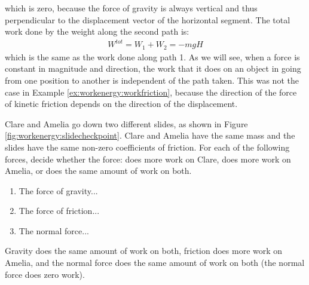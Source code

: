\begin{example}
which is zero, because the force of gravity is always vertical and thus perpendicular to the displacement vector of the horizontal segment. The total work done by the weight along the second path is:
\begin{align*}
W^{tot} = W_1 + W_2 = -mgH
\end{align*}
which is the same as the work done along path 1. As we will see, when a force is constant in magnitude and direction, the work that it does on an object in going from one position to another is independent of the path taken. This was not the case in Example \ref{ex:workenergy:workfriction}, because the direction of the force of kinetic friction depends on the direction of the displacement. 
\end{example} 

\begin{checkpoint}
Clare and Amelia go down two different slides, as shown in Figure \ref{fig:workenergy:slidecheckpoint}. Clare and Amelia have the same mass and the slides have the same non-zero coefficients of friction. 
For each of the following forces, decide whether the force: does more work on Clare, does more work on Amelia, or does the same amount of work on both.
\begin{enumerate}
\item The force of gravity... 
\item The force of friction... 
\item The normal force... 
\end{enumerate}
\begin{answer}
Gravity does the same amount of work on both, friction does more work on Amelia, and the normal force does the same amount of work on both (the normal force does zero work). 
\end{answer}
\end{checkpoint}


